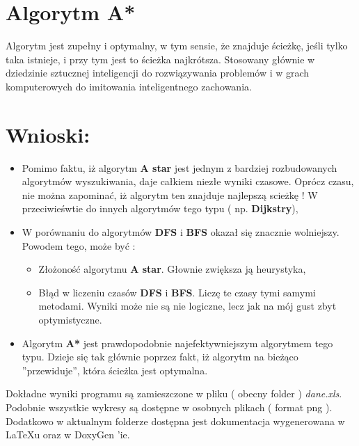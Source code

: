 \documentclass[10 pt]{article}
\begin{document}
\section{Algorytm \textbf{A*}}
Algorytm jest zupełny i optymalny, w tym sensie, że znajduje ścieżkę, jeśli tylko taka istnieje, i przy tym jest to ścieżka najkrótsza. Stosowany głównie w dziedzinie sztucznej inteligencji do rozwiązywania problemów i w grach komputerowych do imitowania inteligentnego zachowania.
\section{Wnioski:}
\begin{itemize}
\item Pomimo faktu, iż algorytm \textbf{A star} jest jednym z bardziej rozbudowanych algorytmów wyszukiwania, daje całkiem niezłe wyniki czasowe. Oprócz czasu, nie można zapominać, iż algorytm ten znajduje najlepszą scieżkę ! W przeciwieśwtie do innych algorytmów tego typu ( np. \textbf{Dijkstry}),
\item W porównaniu do algorytmów \textbf{DFS} i \textbf{BFS} okazał się znacznie wolniejszy. Powodem tego, może być : 
\begin{itemize}
\item Złożoność algorytmu \textbf{A star}. Głownie zwiększa ją heurystyka,
\item Błąd w liczeniu czasów \textbf{DFS} i \textbf{BFS}. Liczę te czasy tymi samymi metodami. Wyniki może nie są nie logiczne, lecz jak na mój gust zbyt optymistyczne.
\end{itemize}
\item Algorytm \textbf{A*} jest prawdopodobnie najefektywniejszym algorytmem tego typu. Dzieje się tak głównie poprzez fakt, iż algorytm na bieżąco ''przewiduje'', która ścieżka jest optymalna.  
\end{itemize}

Dokładne wyniki programu są zamieszczone w pliku ( obecny folder ) \textit{dane.xls}. Podobnie wszystkie wykresy są dostępne w osobnych plikach ( format png ). Dodatkowo w aktualnym folderze dostępna jest dokumentacja wygenerowana w \LaTeX u oraz w DoxyGen 'ie.
\end{document}
